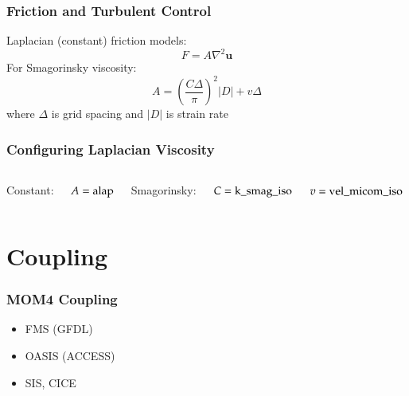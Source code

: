 \documentclass{beamer}
\begin{document}
\begin{frame}
    \frametitle{Friction and Turbulent Control}
    
    Laplacian (constant) friction models:
    $$
    F = A \nabla^2 \mathbf{u}
    $$
    For Smagorinsky viscosity:
    $$
    A = \left(\frac{C \Delta}{\pi}\right)^2 |D| + v \Delta
    $$
    where $\Delta$ is grid spacing and $|D|$ is strain rate
\end{frame}

\begin{frame}
    \frametitle{Configuring Laplacian Viscosity}
    
    \begin{columns}
        
        Constant:
        
        $A = \text{\lstinline|alap|}$
        
        \vspace{10pt}
        
        Smagorinsky:
        
        $C = \text{\lstinline|k_smag_iso|}$
        
        $v = \text{\lstinline|vel_micom_iso|}$
    \end{columns}
\end{frame}

\section{Coupling}
\begin{frame}
    \frametitle{MOM4 Coupling}
    
    \begin{itemize}
        \item FMS (GFDL)
        \item OASIS (ACCESS)
        \item SIS, CICE
    \end{itemize}
\end{frame}

\end{document}
